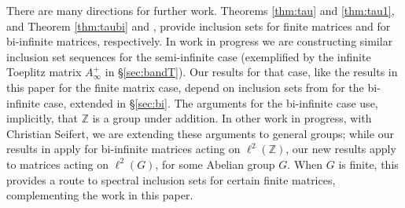 \documentclass[preprint,1p,11pt]{elsarticle}
\newcommand\Z{{\mathbb Z}}
\numberwithin{equation}{section}   %
\numberwithin{figure}{section}  %
\begin{document}
There are many directions for further work.  Theorems \ref{thm:tau} and \ref{thm:tau1}, and Theorem \ref{thm:taubi} and \cite{CW.Heng.ML:SpecIncl1}, provide inclusion sets for finite matrices and for bi-infinite matrices, respectively. In work in progress we are constructing similar inclusion set sequences  for the semi-infinite case (exemplified by the infinite Toeplitz matrix $A_\infty^{+}$ in \S\ref{sec:bandT}). %
Our results for that case, like the results in this paper for the finite matrix case, depend on inclusion sets from \cite{CW.Heng.ML:SpecIncl1} for the bi-infinite case,  extended in \S\ref{sec:bi}. The arguments  for the bi-infinite case use, implicitly, that $\Z$ is a group under addition. In other work in progress, with Christian Seifert, we are extending these arguments to general groups;  while our results in \cite{CW.Heng.ML:SpecIncl1} apply for bi-infinite matrices acting on $\ell^2(\Z)$, our new results apply to matrices acting on $\ell^2(G)$, for some Abelian group $G$. When $G$ is finite, this provides a route to spectral inclusion sets for certain finite matrices, complementing the work in this paper. 
\end{document}
